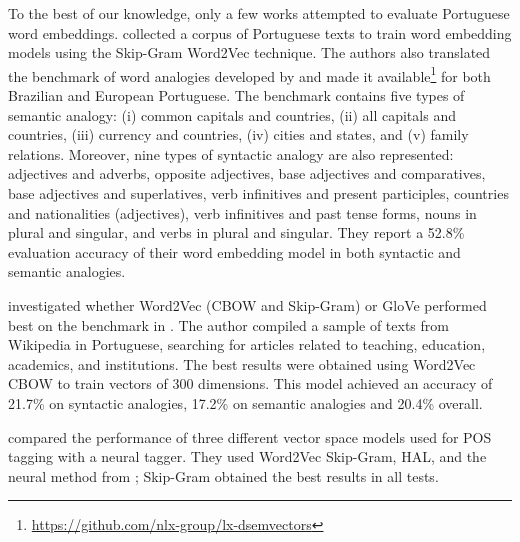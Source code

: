 
To the best of our knowledge, only a few works attempted to evaluate Portuguese word embeddings.
\cite{rodriguesetal2016} collected a corpus of Portuguese texts to train word embedding models using the Skip-Gram Word2Vec technique. The authors also translated the benchmark of word analogies developed by \cite{mikolovetal2013} and made it available\footnote{\url{https://github.com/nlx-group/lx-dsemvectors}} for both Brazilian and European Portuguese. The benchmark contains five types of semantic analogy: (i) common capitals and countries, (ii) all capitals and countries, (iii) currency and countries, (iv) cities and states, and (v) family relations. Moreover, nine types of syntactic analogy are also represented: adjectives and adverbs, opposite adjectives, base adjectives and comparatives, base adjectives and superlatives, verb infinitives and present participles, countries and nationalities (adjectives), verb infinitives and past tense forms, nouns in plural and singular, and verbs in plural and singular. They report a 52.8\% evaluation accuracy of their word embedding model in both syntactic and semantic analogies.


\cite{sousa2016} investigated whether Word2Vec (CBOW and Skip-Gram) or GloVe performed best on the benchmark in \cite{rodriguesetal2016}. The author compiled a sample of texts from Wikipedia in Portuguese, searching for articles related to teaching, education, academics, and institutions. The best results were obtained using Word2Vec CBOW to train vectors of 300 dimensions. This model achieved an accuracy of 21.7\% on syntactic analogies, 17.2\% on semantic analogies and 20.4\% overall.

\cite{Fonseca2015} compared the performance of three different vector space models used for POS tagging with a neural tagger. They used Word2Vec Skip-Gram, HAL, and the neural method from \cite{collobertetal2011}; Skip-Gram obtained the best results in all tests.

